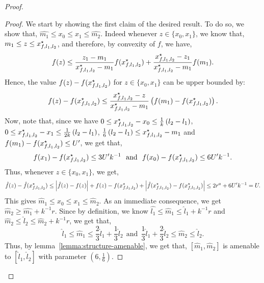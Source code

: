 \begin{proof}
\begin{proof}
We start by showing the first claim of the desired result. To do so, 
we show that, $\hat{m_1} \leq x_0 \leq x_1 \leq \hat{m_2}$. 
Indeed whenever $z \in \{x_0, x_1\}$, we know that, $m_1 \leq z \leq x_{f, l_1, l_2}^\star$,
and therefore, by convexity of $f$, we have,   
\begin{equation*}
f(z) \leq \frac{z_1 - m_1}{x_{f, l_1, l_2}^\star - m_1} f(x_{f, l_1, l_2}^\star) + 
	\frac{x_{f, l_1, l_2}^\star - z_1}{x_{f, l_1, l_2}^\star - m_1} f(m_1).
\end{equation*}
Hence, the value $f(z) - f(x_{f, l_1, l_2}^\star)$ for $z\in \{x_0, x_1\}$ can be upper bounded by: 
\begin{equation*}
f(z) - f(x_{f, l_1, l_2}^\star) \leq \frac{x_{f, l_1, l_2}^\star - z}{x_{f, l_1, l_2}^\star - m_1}
	\left(f(m_1) - f(x_{f, l_1, l_2}^\star)\right). 
\end{equation*}
Now, note that, since we have $0\leq x_{f, l_1, l_2}^\star - x_0 \leq \frac{1}{k}\left(l_2 - l_1\right)$, 
$0\leq x_{f, l_1, l_2}^\star - x_1 \leq \frac{1}{2k}\left(l_2 - l_1\right)$, 
$\frac{1}{6} \left(l_2 - l_1\right) \leq x_{f, l_1, l_2}^\star - m_1$ and 
$f(m_1) - f(x_{f, l_1, l_2}^\star)\leq U^\prime$, we get that, 
\begin{equation}
\label{eqn:how-close-is-x-1}
f(x_1) - f(x_{f, l_1, l_2}^\star) \leq 3U^\prime k^{-1}~~\text{and}~~
	f(x_0) - f(x_{f, l_1, l_2}^\star)  \leq 6U^\prime k^{-1}.
\end{equation}
Thus, whenever $z \in \{x_0, x_1\}$, we get, 
\begin{equation*}
\hat{f}(z) - \hat{f}(x_{f, l_1, l_2}^\star) \leq \left|\hat{f}(z) - f(z)\right| + f(z) - 
	f(x_{f, l_1, l_2}^\star) + \left|\hat{f}(x_{f, l_1, l_2}^\star) - f(x_{f, l_1, l_2}^\star)\right|
		\leq 2r^a + 6U^\prime k^{-1} = U.
\end{equation*}
This gives $\hat{m}_1 \leq x_0 \leq x_1 \leq \hat{m}_2$. As an immediate consequence, 
we get $\hat{m}_2 \geq \hat{m_1} + k^{-1} r$. Since by definition, we know 
$\hat{l_1} \leq \hat{m}_1 \leq \hat{l}_1 + k^{-1} r$ and 
$\hat{m}_2 \leq \hat{l}_2 \leq \hat{m}_2 + k^{-1} r$, we get that, 
\begin{equation*}
\hat{l}_1 \leq \hat{m}_1 \leq \frac{2}{3}\hat{l}_1 + \frac{1}{3} \hat{l}_2~~\text{and}~~
	\frac{1}{3} \hat{l}_1 + \frac{2}{3} \hat{l}_2 \leq \hat{m}_2 \leq \hat{l}_2. 
\end{equation*}
Thus, by lemma~\ref{lemma:structure-amenable}, we get that,  
$[\hat{m}_1, \hat{m}_2]$ is amenable to $[\hat{l}_1, \hat{l}_2]$ with parameter 
$(6, \frac{1}{6})$.


\end{proof}
\end{proof}
